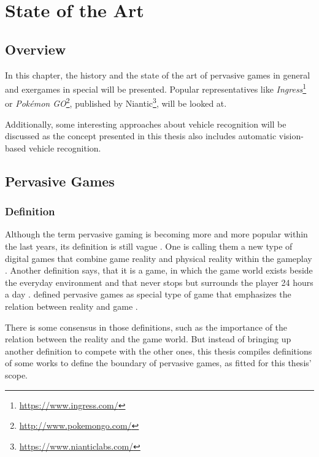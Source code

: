 \chapter{State of the Art}\label{ch:stateOfTheArt}
\section{Overview}
In this chapter, the history and the state of the art of pervasive games in general and exergames in special will be presented. Popular representatives like \emph{Ingress}\footnote{\url{https://www.ingress.com/}} or \emph{Pok\'{e}mon GO}\footnote{\url{http://www.pokemongo.com/}}, published by Niantic\footnote{\url{https://www.nianticlabs.com/}}, will be looked at.

Additionally, some interesting approaches about vehicle recognition
will be discussed as the concept presented in this thesis also includes automatic vision-based vehicle recognition.

\section{Pervasive Games}
\subsection{Definition}
Although the term pervasive gaming is becoming more and more popular within the last years, its definition is still vague \citep{nieuwdorp2009pervasive}. One is calling them a new type of digital games that combine game reality and physical reality within the gameplay \citep{Lankoski:2004:CSP:1028014.1028083}. Another definition says, that it is a game, in which the game world exists beside the everyday environment and that never stops but surrounds the player 24 hours a day \citep{sotamaa2002all}.
\citeauthor{nieuwdorp2009pervasive} defined pervasive games as special type of game that emphasizes the relation between reality and game \citep{nieuwdorp2009pervasive}.

There is some consensus in those definitions, such as the importance of the relation between the reality and the game world. But instead of bringing up another definition to compete with the other ones, this thesis compiles definitions of some works to define the boundary of pervasive games, as fitted for this thesis' scope.

